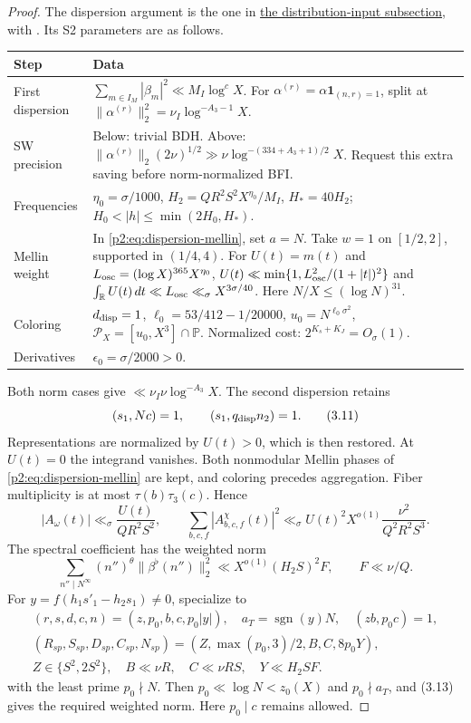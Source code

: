 \begin{proof}
The dispersion argument is the one in
\hyperref[p2:dispersion-proof]{the distribution-input subsection}, with
\cite[Theorem~2.8, (3.17)--(3.20), (3.25)--(3.27), (3.57)--(3.60), (3.70)--(3.73)]{Z1}.
Its S2 parameters are as follows.
\begin{longtable}{@{}p{}p{}@{}}
\toprule
Step & Data \\
\midrule
First dispersion & $\sum_{m\in I_M}|\beta_m|^2\ll M_I\log^cX$.
For $\alpha^{(r)}=\alpha\mathbf1_{(n,r)=1}$, split at
$\|\alpha^{(r)}\|_2^2=\nu_I\log^{-A_3-1}X$. \\
SW precision & Below: trivial BDH.
Above: $\|\alpha^{(r)}\|_2(2\nu)^{1/2}\gg\nu\log^{-(334+A_3+1)/2}X$.
Request this extra saving before norm-normalized BFI. \\
Frequencies & $\eta_0=\sigma/1000$,
$H_2=QR^2S^2X^{\eta_0}/M_I$, $H_*=40H_2$;
$H_0<|h|\le\min(2H_0,H_*)$. \\
Mellin weight & In \eqref{p2:eq:dispersion-mellin}, set $a=N$.
Take $w=1$ on $[1/2,2]$, supported in $(1/4,4)$.
For $U(t)=m(t)$ and $L_{\rm osc}=(\log X)^{365}X^{\eta_0}$,
$U(t)\ll\min\{1,L_{\rm osc}^2/(1+|t|)^2\}$ and
$\int_{\mathbb R}U(t)\,dt\ll L_{\rm osc}\ll_\sigma X^{3\sigma/40}$.
Here $N/X\le(\log N)^{31}$. \\
Coloring & $d_{\rm disp}=1$, $\ell_0=53/412-1/20000$,
$u_0=N^{\ell_0\sigma^2}$, $\mathcal P_X=[u_0,X^3]\cap\mathbb P$.
Normalized cost: $2^{K_s+K_J}=O_\sigma(1)$. \\
Derivatives & $\epsilon_0=\sigma/2000>0$. \\
\bottomrule
\end{longtable}
Both norm cases give $\ll\nu_I\nu\log^{-A_3}X$.
The second dispersion retains
\[
 (s_1,Nc)=1,\qquad(s_1,q_{\rm disp}n_2)=1.
 \tag{3.11}
\]
Representations are normalized by $U(t)>0$, which is then restored.
At $U(t)=0$ the integrand vanishes.
Both nonmodular Mellin phases of \eqref{p2:eq:dispersion-mellin} are kept,
and coloring precedes aggregation.
Fiber multiplicity is at most $\tau(b)\tau_3(c)$. Hence
\[
 |A_\omega(t)|\ll_\sigma\frac{U(t)}{QR^2S^2},\qquad
 \sum_{b,c,f}|A^\chi_{b,c,f}(t)|^2
 \ll_\sigma U(t)^2X^{o(1)}\frac{\nu^2}{Q^2R^2S^3}.
 \tag{3.12}
\]
The spectral coefficient has the weighted norm
\[
 \sum_{n''\mid N^\infty}(n'')^\theta
 \|\beta^\flat(n'')\|_2^2
 \ll X^{o(1)}(H_2S)^2F,\qquad F\ll\nu/Q.
 \tag{3.13}
\]
For $y=f(h_1s'_1-h_2s_1)\ne0$, specialize to
\[
\begin{gathered}
 (r,s,d,c,n)=(z,p_0,b,c,p_0|y|),\quad
 a_T=\operatorname{sgn}(y)N,\quad(zb,p_0c)=1,\\
 (R_{sp},S_{sp},D_{sp},C_{sp},N_{sp})
 =(Z,\max(p_0,3)/2,B,C,8p_0Y),\\
 Z\in\{S^2,2S^2\},\quad B\ll\nu R,\quad
 C\ll\nu RS,\quad Y\ll H_2SF.
\end{gathered}
\]
with the least prime $p_0\nmid N$.
Then $p_0\ll\log N<z_0(X)$ and $p_0\nmid a_T$, and (3.13) gives the required weighted norm.
Here $p_0\mid c$ remains allowed.


\end{proof}
